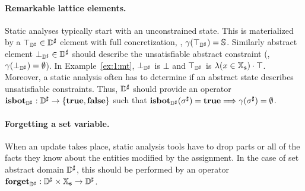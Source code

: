 \paragraph{Remarkable lattice elements.}
Static analyses typically start with an unconstrained state.
This is materialized by a \( \top_{{\mathbb{D}}^{\sharp}} \in {\mathbb{D}}^{\sharp} \) element with full
concretization, \ie, \( \gamma( \top_{{\mathbb{D}}^{\sharp}} ) = \mathbb{S} \).
Similarly abstract element \( \bot_{{\mathbb{D}}^{\sharp}} \in {\mathbb{D}}^{\sharp} \) should describe
the unsatisfiable abstract constraint (\ie, \( \gamma( \bot_{{\mathbb{D}}^{\sharp}} ) =
\emptyset \)).
In Example~\ref{ex:1:mt}, \( \bot_{{\mathbb{D}}^{\sharp}} \) is \( \bot \) and \( \top_{{\mathbb{D}}^{\sharp}} \)
is \( \lambda (x \in \mathbb{X}_{\bf s}) \cdot \top \).
Moreover, a static analysis often has to determine if an abstract state
describes unsatisfiable constraints.
Thus, \( {\mathbb{D}}^{\sharp} \) should provide an operator \( \textbf{isbot}_{{\mathbb{D}}^{\sharp}}: {\mathbb{D}}^{\sharp}
\rightarrow \{ \mathbf{true}, \mathbf{false} \} \) such that \( \textbf{isbot}_{{\mathbb{D}}^{\sharp}}( {\sigma}^{\sharp} )
= \mathbf{true} \Longrightarrow \gamma( {\sigma}^{\sharp} ) = \emptyset \).

\paragraph{Forgetting a set variable.}
When an update takes place, static analysis tools have to drop parts or
all of the facts they know about the entities modified by the assignment.
In the case of set abstract domain \( {\mathbb{D}}^{\sharp} \), this should be performed
by an operator \( \textbf{forget}_{{\mathbb{D}}^{\sharp}}: {\mathbb{D}}^{\sharp} \times \mathbb{X}_{\bf s} \rightarrow {\mathbb{D}}^{\sharp} \).

